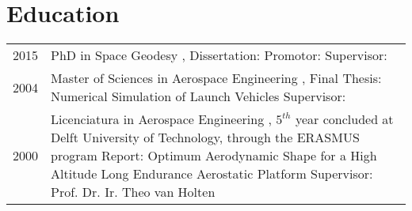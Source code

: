 \documentclass[a4paper]{article}
\newcommand{\dynhref}[2]{%
  \iftoggle{expliciturl}{%
    #2 (\href{#1}{\texttt{\detokenize{#1}}})%
  }{%
    \href{#1}{#2}%
  }%
}
\newlength{\listskipbig}
\newenvironment{cvsection}[2]{
  \vspace{0.15in}
  \section*{#1}
  \vspace{-0.2in}
  \begin{longtable}{lp{#2}}
}{
  \end{longtable}
}
\begin{document}
\clearpage

\begin{cvsection}{Education}{13.5cm}

2015 & PhD in Space Geodesy\newline
      \dynhref{http://tinyurl.com/GRS-TUDelft}{Geoscience \& Remote Sensing}, \dynhref{http://www.tudelft.nl/}{Delft University of Technology}\newline
      Dissertation: \dynhref{http://tinyurl.com/SatGrav}{Next-generation satellite gravimetry for measuring mass transport in the Earth system}\newline
      Promotor: \dynhref{http://tinyurl.com/ProfKlees}{Prof. Dr.-Ing. habil. Roland Klees}\newline
      Supervisor: \dynhref{http://tinyurl.com/DrDitmar}{dr.ir. Pavel Ditmar}\\[\listskipbig]

2004 & Master of Sciences in Aerospace Engineering\newline
      \dynhref{http://www.as.lr.tudelft.nl}{Astrodynamics and Space Missions}, \dynhref{http://www.tudelft.nl/}{Delft University of Technology}\newline
      Final Thesis: Numerical Simulation of Launch Vehicles\newline
      Supervisor: \dynhref{http://tinyurl.com/ProfAmbrosius}{Prof.ir. B.A.C. Ambrosius}\\[\listskipbig]

2000 & Licenciatura in Aerospace Engineering\newline
       \dynhref{http://www.ist.utl.pt/}{Instituto Superior T{\'e}cnico}, \dynhref{http://www.utl.pt/}{Technical University of Lisbon}\newline
       $5^{th}$ year concluded at Delft University of Technology, through the ERASMUS program\newline
       Report: Optimum Aerodynamic Shape for a High Altitude Long Endurance Aerostatic Platform\newline
       Supervisor: Prof. Dr. Ir. Theo van Holten\\[\listskipbig]

\end{cvsection}



\end{document}

